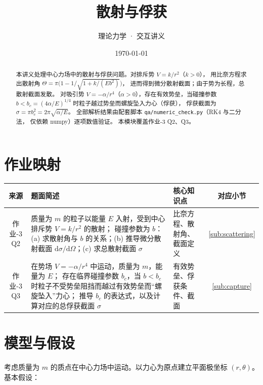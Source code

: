 \documentclass[UTF8,a4paper,11pt]{ctexart}
\title{\textbf{散射与俘获}}
\author{理论力学 · 交互讲义}
\date{\today}
\begin{document}
\maketitle

\begin{abstract}
本讲义处理中心力场中的散射与俘获问题。对排斥势 $V=k/r^2$（$k>0$），
用比奈方程求出散射角 $\Theta=\pi\bigl(1-1/\sqrt{1+k/(Eb^2)}\bigr)$，
进而得到微分散射截面；由于势为长程，总散射截面发散。
对吸引势 $V=-\alpha/r^4$（$\alpha>0$），存在有效势垒，当碰撞参数
$b<b_c=(4\alpha/E)^{1/4}$ 时粒子越过势垒而螺旋坠入力心（俘获），
俘获截面为 $\sigma=\pi b_c^2=2\pi\sqrt{\alpha/E}$。
全部解析结果由配套脚本 \texttt{qa/numeric\_check.py}（RK4 与二分法，
仅依赖 numpy）逐项数值验证。
本模块覆盖作业-3 Q2、Q3。
\end{abstract}

\tableofcontents
\newpage

\section{作业映射}
\label{sec:map}

\begin{center}
\small
\begin{tabular}{cp{6.5cm}p{3.5cm}c}
\toprule
来源 & 题面简述 & 核心知识点 & 对应小节 \\
\midrule
作业-3 Q2 & 质量为 $m$ 的粒子以能量 $E$ 入射，受到中心排斥势 $V=k/r^2$ 的散射；
  碰撞参数为 $b$：(a) 求散射角与 $b$ 的关系；(b) 推导微分散射截面
  $\mathrm{d}\sigma/\mathrm{d}\Omega$；(c) 求总散射截面 $\sigma$ &
  比奈方程、散射角、截面定义 & \ref{sub:scattering} \\
作业-3 Q3 & 在势场 $V=-\alpha/r^4$ 中运动，质量为 $m$，能量为 $E$；
  存在临界碰撞参数 $b_c$，当 $b<b_c$ 时粒子不受势垒阻挡而越过有效势垒而``螺旋坠入''力心；
  推导 $b_c$ 的表达式，以及计算对应的总俘获截面 $\sigma$ &  有效势垒、俘获条件、截面 & \ref{sub:capture} \\
\bottomrule
\end{tabular}
\end{center}

\section{模型与假设}
\label{sec:model}

考虑质量为 $m$ 的质点在中心力场中运动。以力心为原点建立平面极坐标
$(r,\theta)$。基本假设：
\end{document}
